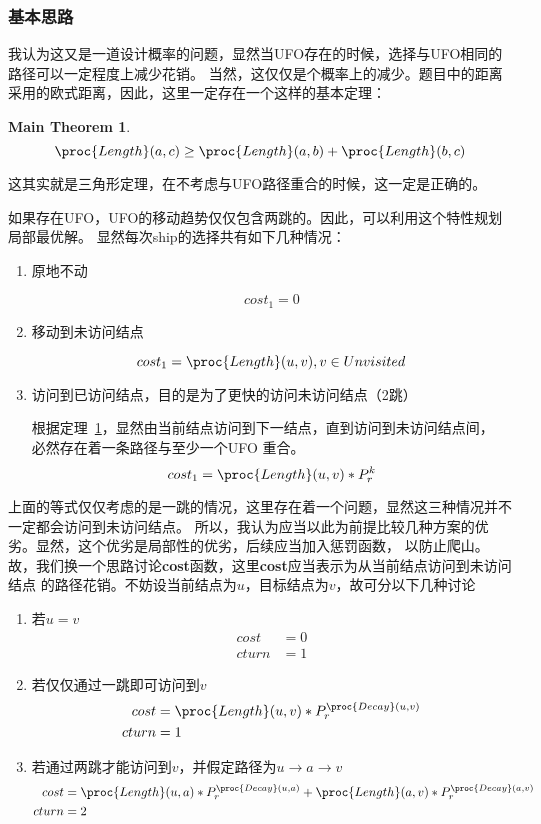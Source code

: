 \documentclass[hyperref,UTF8]{ctexart}
\newtheorem{mthm}[thm]{Main Theorem}
\theoremstyle{definition}
\theoremstyle{remark}
\numberwithin{equation}{subsection}
\newcommand{\Emph}{\textbf}
\begin{document}
\subsubsection{基本思路}

	我认为这又是一道设计概率的问题，显然当UFO存在的时候，选择与UFO相同的路径可以一定程度上减少花销。
	当然，这仅仅是个概率上的减少。题目中的距离采用的欧式距离，因此，这里一定存在一个这样的基本定理：
	\begin{mthm}
	\label{mthm:triangle}
		\[
            \proc{Length}(a, c) \ge \proc{Length}(a, b) + \proc{Length}(b, c)
        \]
	\end{mthm}
	这其实就是三角形定理，在不考虑与UFO路径重合的时候，这一定是正确的。
	
	如果存在UFO，UFO的移动趋势仅仅包含两跳的。因此，可以利用这个特性规划局部最优解。
	显然每次ship的选择共有如下几种情况：
	\begin{enumerate}[(1)]
		
		\item 原地不动
		
		\[
			cost_1 = 0
		\]
		
		\item 移动到未访问结点
		
		\[
			cost_1 = \proc{Length}(u, v), v \in Unvisited
		\]
		
		\item 访问到已访问结点，目的是为了更快的访问未访问结点（2跳）
		
		根据定理~\ref{mthm:triangle}，显然由当前结点访问到下一结点，直到访问到未访问结点间，
		必然存在着一条路径与至少一个UFO 重合。
		\[
			cost_1 = \proc{Length}(u, v) * P_r^k
		\]
	
	\end{enumerate}
	上面的等式仅仅考虑的是一跳的情况，这里存在着一个问题，显然这三种情况并不一定都会访问到未访问结点。
	所以，我认为应当以此为前提比较几种方案的优劣。显然，这个优劣是局部性的优劣，后续应当加入惩罚函数，
	以防止爬山。故，我们换一个思路讨论\Emph{cost}函数，这里\Emph{cost}应当表示为从当前结点访问到未访问结点
	的路径花销。不妨设当前结点为$u$，目标结点为$v$，故可分以下几种讨论
	\begin{enumerate}[(1)]
	
		\item 若$u = v$
		\begin{align*}
			cost	&=	0	\\
			cturn	&=	1
		\end{align*}
		
		\item 若仅仅通过一跳即可访问到$v$
		\begin{align*}
			cost	&= 	\proc{Length}(u, v) * P_r^{\proc{Decay}(u, v)}	\\
			cturn	&=	1
		\end{align*}
		
		\item 若通过两跳才能访问到$v$，并假定路径为$u \rightarrow a \rightarrow v$
		\begin{align*}
			cost	&=	\proc{Length}(u, a) * P_r^{\proc{Decay}(u, a)} + \proc{Length}(a, v) * P_r^{\proc{Decay}(a, v)}	\\
			cturn	&=	2
		\end{align*}
		
	\end{enumerate}
\end{document}
